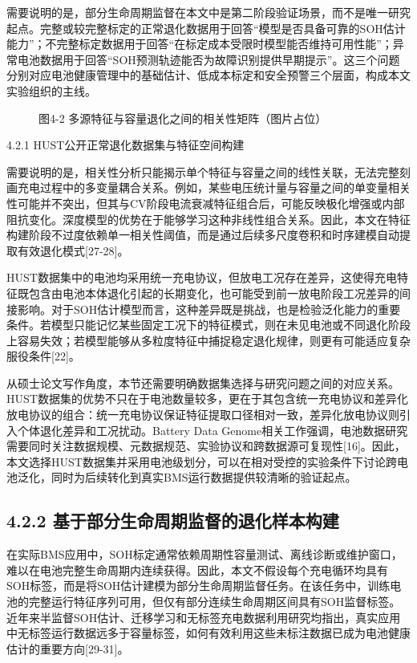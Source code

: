 \documentclass[12pt, a4paper]{ctexart}
\begin{document}
需要说明的是，部分生命周期监督在本文中是第二阶段验证场景，而不是唯一研究起点。完整或较完整标定的正常退化数据用于回答“模型是否具备可靠的SOH估计能力”；不完整标定数据用于回答“在标定成本受限时模型能否维持可用性能”；异常电池数据用于回答“SOH预测轨迹能否为故障识别提供早期提示”。这三个问题分别对应电池健康管理中的基础估计、低成本标定和安全预警三个层面，构成本文实验组织的主线。



\begin{figure}[H]
  \centering
  \caption{图4-2  多源特征与容量退化之间的相关性矩阵（图片占位）}
  \label{fig:}
\end{figure}

4.2.1 HUST公开正常退化数据集与特征空间构建


需要说明的是，相关性分析只能揭示单个特征与容量之间的线性关联，无法完整刻画充电过程中的多变量耦合关系。例如，某些电压统计量与容量之间的单变量相关性可能并不突出，但其与CV阶段电流衰减特征组合后，可能反映极化增强或内部阻抗变化。深度模型的优势在于能够学习这种非线性组合关系。因此，本文在特征构建阶段不过度依赖单一相关性阈值，而是通过后续多尺度卷积和时序建模自动提取有效退化模式[27-28]。


HUST数据集中的电池均采用统一充电协议，但放电工况存在差异，这使得充电特征既包含由电池本体退化引起的长期变化，也可能受到前一放电阶段工况差异的间接影响。对于SOH估计模型而言，这种差异既是挑战，也是检验泛化能力的重要条件。若模型只能记忆某些固定工况下的特征模式，则在未见电池或不同退化阶段上容易失效；若模型能够从多粒度特征中捕捉稳定退化规律，则更有可能适应复杂服役条件[22]。


从硕士论文写作角度，本节还需要明确数据集选择与研究问题之间的对应关系。HUST数据集的优势不只在于电池数量较多，更在于其包含统一充电协议和差异化放电协议的组合：统一充电协议保证特征提取口径相对一致，差异化放电协议则引入个体退化差异和工况扰动。Battery Data Genome相关工作强调，电池数据研究需要同时关注数据规模、元数据规范、实验协议和跨数据源可复现性[16]。因此，本文选择HUST数据集并采用电池级划分，可以在相对受控的实验条件下讨论跨电池泛化，同时为后续转化到真实BMS运行数据提供较清晰的验证起点。



\subsection{4.2.2 基于部分生命周期监督的退化样本构建}

在实际BMS应用中，SOH标定通常依赖周期性容量测试、离线诊断或维护窗口，难以在电池完整生命周期内连续获得。因此，本文不假设每个充电循环均具有SOH标签，而是将SOH估计建模为部分生命周期监督任务。在该任务中，训练电池的完整运行特征序列可用，但仅有部分连续生命周期区间具有SOH监督标签。近年来半监督SOH估计、迁移学习和无标签充电数据利用研究均指出，真实应用中无标签运行数据远多于容量标签，如何有效利用这些未标注数据已成为电池健康估计的重要方向[29-31]。
\end{document}
